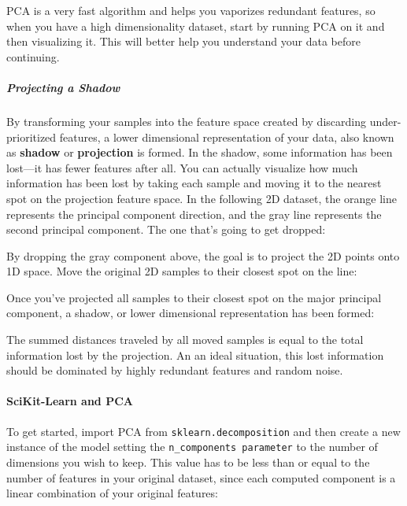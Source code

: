 \documentclass[11pt]{article}
\begin{document}
PCA is a very fast algorithm and helps you vaporizes redundant features,
so when you have a high dimensionality dataset, start by running PCA on
it and then visualizing it. This will better help you understand your
data before continuing.

\hypertarget{projecting-a-shadow}{%
\subparagraph{Projecting a Shadow}\label{projecting-a-shadow}}

By transforming your samples into the feature space created by
discarding under-prioritized features, a lower dimensional
representation of your data, also known as \textbf{shadow} or
\textbf{projection} is formed. In the shadow, some information has been
lost---it has fewer features after all. You can actually visualize how
much information has been lost by taking each sample and moving it to
the nearest spot on the projection feature space. In the following 2D
dataset, the orange line represents the principal component direction,
and the gray line represents the second principal component. The one
that's going to get dropped:

By dropping the gray component above, the goal is to project the 2D
points onto 1D space. Move the original 2D samples to their closest spot
on the line:

Once you've projected all samples to their closest spot on the major
principal component, a shadow, or lower dimensional representation has
been formed:

The summed distances traveled by all moved samples is equal to the total
information lost by the projection. An an ideal situation, this lost
information should be dominated by highly redundant features and random
noise.

\hypertarget{scikit-learn-and-pca}{%
\paragraph{SciKit-Learn and PCA}\label{scikit-learn-and-pca}}

To get started, import PCA from \texttt{sklearn.decomposition} and then
create a new instance of the model setting the
\texttt{n\_components\ parameter} to the number of dimensions you wish
to keep. This value has to be less than or equal to the number of
features in your original dataset, since each computed component is a
linear combination of your original features:
\end{document}
